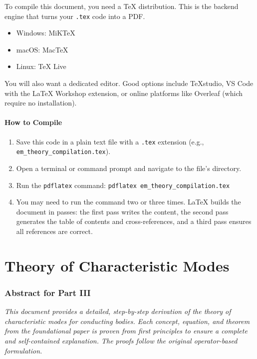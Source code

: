 \documentclass[11pt,a4paper]{article}
\begin{document}
To compile this document, you need a TeX distribution. This is the backend engine that turns your \texttt{.tex} code into a PDF.
\begin{itemize}
    \item Windows: MiKTeX
    \item macOS: MacTeX
    \item Linux: TeX Live
\end{itemize}
You will also want a dedicated editor. Good options include TeXstudio, VS Code with the LaTeX Workshop extension, or online platforms like Overleaf (which require no installation).

\subsection{How to Compile}
\begin{enumerate}
    \item Save this code in a plain text file with a \texttt{.tex} extension (e.g., \texttt{em\_theory\_compilation.tex}).
    \item Open a terminal or command prompt and navigate to the file's directory.
    \item Run the \texttt{pdflatex} command: \texttt{pdflatex em\_theory\_compilation.tex}
    \item You may need to run the command two or three times. \LaTeX{} builds the document in passes: the first pass writes the content, the second pass generates the table of contents and cross-references, and a third pass ensures all references are correct.
\end{enumerate}

\newpage


\part{Theory of Characteristic Modes}
\section*{Abstract for Part III}
\textit{This document provides a detailed, step-by-step derivation of the theory of characteristic modes for conducting bodies. Each concept, equation, and theorem from the foundational paper is proven from first principles to ensure a complete and self-contained explanation. The proofs follow the original operator-based formulation.}
\end{document}
